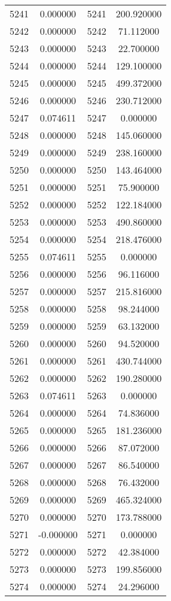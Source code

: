 \documentclass[12pt]{article}
\begin{document}
\begin{longtable}{@{}cccc@{}}
5241 & 0.000000 & 5241 & 200.920000 \\
5242 & 0.000000 & 5242 & 71.112000 \\
5243 & 0.000000 & 5243 & 22.700000 \\
5244 & 0.000000 & 5244 & 129.100000 \\
5245 & 0.000000 & 5245 & 499.372000 \\
5246 & 0.000000 & 5246 & 230.712000 \\
5247 & 0.074611 & 5247 & 0.000000 \\
5248 & 0.000000 & 5248 & 145.060000 \\
5249 & 0.000000 & 5249 & 238.160000 \\
5250 & 0.000000 & 5250 & 143.464000 \\
5251 & 0.000000 & 5251 & 75.900000 \\
5252 & 0.000000 & 5252 & 122.184000 \\
5253 & 0.000000 & 5253 & 490.860000 \\
5254 & 0.000000 & 5254 & 218.476000 \\
5255 & 0.074611 & 5255 & 0.000000 \\
5256 & 0.000000 & 5256 & 96.116000 \\
5257 & 0.000000 & 5257 & 215.816000 \\
5258 & 0.000000 & 5258 & 98.244000 \\
5259 & 0.000000 & 5259 & 63.132000 \\
5260 & 0.000000 & 5260 & 94.520000 \\
5261 & 0.000000 & 5261 & 430.744000 \\
5262 & 0.000000 & 5262 & 190.280000 \\
5263 & 0.074611 & 5263 & 0.000000 \\
5264 & 0.000000 & 5264 & 74.836000 \\
5265 & 0.000000 & 5265 & 181.236000 \\
5266 & 0.000000 & 5266 & 87.072000 \\
5267 & 0.000000 & 5267 & 86.540000 \\
5268 & 0.000000 & 5268 & 76.432000 \\
5269 & 0.000000 & 5269 & 465.324000 \\
5270 & 0.000000 & 5270 & 173.788000 \\
5271 & -0.000000 & 5271 & 0.000000 \\
5272 & 0.000000 & 5272 & 42.384000 \\
5273 & 0.000000 & 5273 & 199.856000 \\
5274 & 0.000000 & 5274 & 24.296000 \\

\end{longtable}
\end{document}
